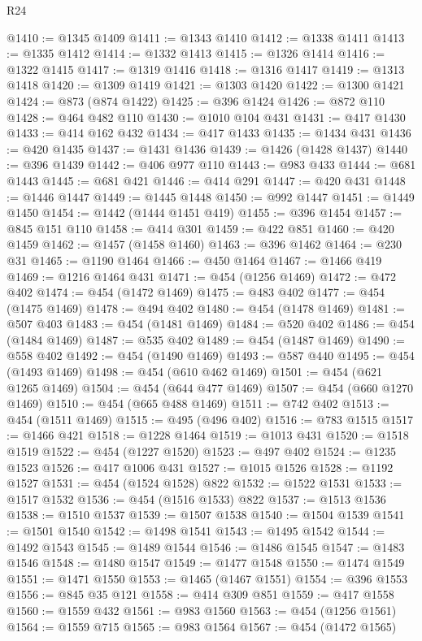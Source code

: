 \begin{lexlean}{R24}
\begin{coremodule}
@1410 := @1345 @1409
@1411 := @1343 @1410
@1412 := @1338 @1411
@1413 := @1335 @1412
@1414 := @1332 @1413
@1415 := @1326 @1414
@1416 := @1322 @1415
@1417 := @1319 @1416
@1418 := @1316 @1417
@1419 := @1313 @1418
@1420 := @1309 @1419
@1421 := @1303 @1420
@1422 := @1300 @1421
@1424 := @873 (@874 @1422)
@1425 := @396 @1424
@1426 := @872 @110
@1428 := @464 @482 @110
@1430 := @1010 @104 @431
@1431 := @417 @1430
@1433 := @414 @162 @432
@1434 := @417 @1433
@1435 := @1434 @431
@1436 := @420 @1435
@1437 := @1431 @1436
@1439 := @1426 (@1428 @1437)
@1440 := @396 @1439
@1442 := @406 @977 @110
@1443 := @983 @433
@1444 := @681 @1443
@1445 := @681 @421
@1446 := @414 @291
@1447 := @420 @431
@1448 := @1446 @1447
@1449 := @1445 @1448
@1450 := @992 @1447
@1451 := @1449 @1450
@1454 := @1442 (@1444 @1451 @419)
@1455 := @396 @1454
@1457 := @845 @151 @110
@1458 := @414 @301
@1459 := @422 @851
@1460 := @420 @1459
@1462 := @1457 (@1458 @1460)
@1463 := @396 @1462
@1464 := @230 @31
@1465 := @1190 @1464
@1466 := @450 @1464
@1467 := @1466 @419
@1469 := @1216 @1464 @431
@1471 := @454 (@1256 @1469)
@1472 := @472 @402
@1474 := @454 (@1472 @1469)
@1475 := @483 @402
@1477 := @454 (@1475 @1469)
@1478 := @494 @402
@1480 := @454 (@1478 @1469)
@1481 := @507 @403
@1483 := @454 (@1481 @1469)
@1484 := @520 @402
@1486 := @454 (@1484 @1469)
@1487 := @535 @402
@1489 := @454 (@1487 @1469)
@1490 := @558 @402
@1492 := @454 (@1490 @1469)
@1493 := @587 @440
@1495 := @454 (@1493 @1469)
@1498 := @454 (@610 @462 @1469)
@1501 := @454 (@621 @1265 @1469)
@1504 := @454 (@644 @477 @1469)
@1507 := @454 (@660 @1270 @1469)
@1510 := @454 (@665 @488 @1469)
@1511 := @742 @402
@1513 := @454 (@1511 @1469)
@1515 := @495 (@496 @402)
@1516 := @783 @1515
@1517 := @1466 @421
@1518 := @1228 @1464
@1519 := @1013 @431
@1520 := @1518 @1519
@1522 := @454 (@1227 @1520)
@1523 := @497 @402
@1524 := @1235 @1523
@1526 := @417 @1006 @431
@1527 := @1015 @1526
@1528 := @1192 @1527
@1531 := @454 (@1524 @1528) @822
@1532 := @1522 @1531
@1533 := @1517 @1532
@1536 := @454 (@1516 @1533) @822
@1537 := @1513 @1536
@1538 := @1510 @1537
@1539 := @1507 @1538
@1540 := @1504 @1539
@1541 := @1501 @1540
@1542 := @1498 @1541
@1543 := @1495 @1542
@1544 := @1492 @1543
@1545 := @1489 @1544
@1546 := @1486 @1545
@1547 := @1483 @1546
@1548 := @1480 @1547
@1549 := @1477 @1548
@1550 := @1474 @1549
@1551 := @1471 @1550
@1553 := @1465 (@1467 @1551)
@1554 := @396 @1553
@1556 := @845 @35 @121
@1558 := @414 @309 @851
@1559 := @417 @1558
@1560 := @1559 @432
@1561 := @983 @1560
@1563 := @454 (@1256 @1561)
@1564 := @1559 @715
@1565 := @983 @1564
@1567 := @454 (@1472 @1565)

\end{coremodule}
\end{lexlean}

